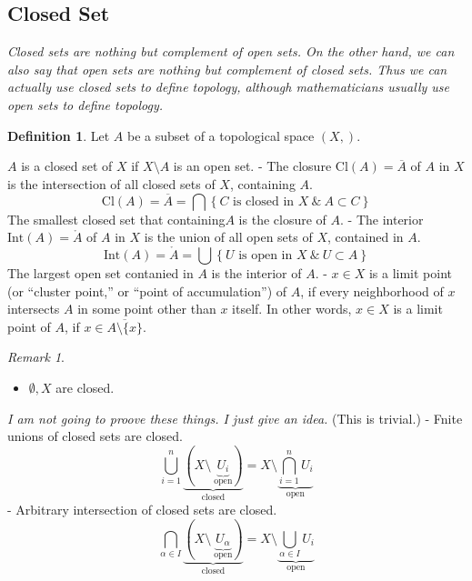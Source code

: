 \documentclass[
]{book}
\providecommand{\tightlist}{%
  \setlength{\itemsep}{0pt}\setlength{\parskip}{0pt}}
\theoremstyle{definition}
\newtheorem{definition}{Definition}[chapter]
\theoremstyle{definition}
\theoremstyle{definition}
\theoremstyle{definition}
\theoremstyle{remark}
\newtheorem*{remark}{Remark}
\begin{document}
\hypertarget{closed-set}{%
\subsection{Closed Set}\label{closed-set}}

\emph{Closed sets are nothing but complement of open sets. On the other hand, we can also say that open sets are nothing but complement of closed sets. Thus we can actually use closed sets to define topology, although mathematicians usually use open sets to define topology.}

\begin{definition}
\protect\hypertarget{def:unnamed-chunk-50}{}\label{def:unnamed-chunk-50}Let \(A\) be a subset of a topological space \((X, \mathcal{})\).

\(A\) is a closed set of \(X\) if \(X\setminus A\) is an open set.
- The closure Cl\((A)=\overline{A}\) of \(A\) in \(X\) is the intersection of all closed sets of \(X\), containing \(A\).
\[\text{Cl}(A)=\overline{A}=\bigcap \left\{C \text{ is closed in } X~ \&~  A \subset C\right\}\]
The smallest closed set that containing\(A\) is the closure of \(A\).
- The interior \(\text{Int}(A)=\mathring{A}\) of \(A\) in \(X\) is the union of all open sets of \(X\), contained in \(A\).
\[\text{Int}(A)=\mathring{A}=\bigcup \left\{U \text{ is open in } X~ \&~  U \subset A\right\}\]
The largest open set contanied in \(A\) is the interior of \(A\).
- \(x \in X\) is a limit point (or ``cluster point,'' or ``point of accumulation'') of \(A\),
if every neighborhood
of \(x\) intersects \(A\) in some point other than \(x\) itself. In other words, \(x \in X\) is a limit point of \(A\), if \(x \in \overline{A\setminus\{x\}}\).
\end{definition}

\begin{remark}
\leavevmode

\begin{itemize}
\tightlist
\item
  \(\emptyset, X\) are closed.
\end{itemize}

\emph{I am not going to proove these things. I just give an idea.}
(This is trivial.)
- Fnite unions of closed sets are closed.
\[  \bigcup_{i=1}^n
    \underbrace{(X\setminus~ \underbrace{U_i}_{\text{open}})}_{\text{closed}}
    =X\setminus \underbrace{\bigcap_{i=1}^nU_i}_{\text{open}}\]
- Arbitrary intersection of closed sets are closed.
\[  \bigcap_{\alpha\in I}
    \underbrace{(X\setminus~ \underbrace{U_\alpha}_{\text{open}})}_{\text{closed}}
    =X\setminus \underbrace{\bigcup_{\alpha \in I} U_i}_{\text{open}}\]

\end{remark}
\end{document}
